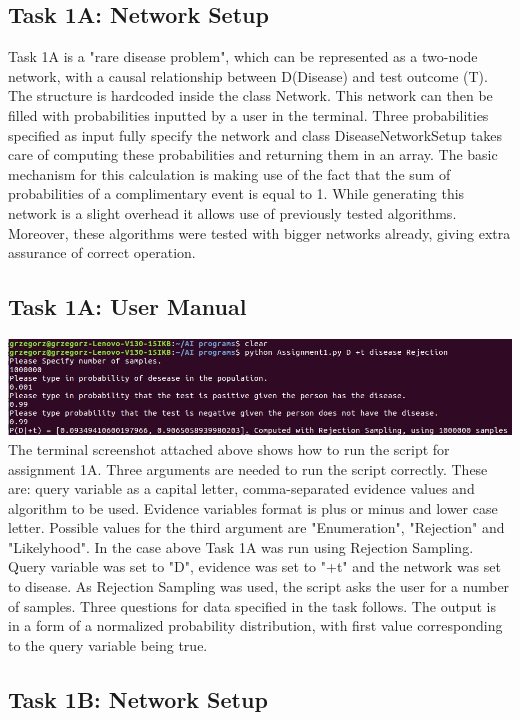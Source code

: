 \documentclass[10pt]{article}
\begin{document}
\subsection{Task 1A: Network Setup}
Task 1A is a "rare disease problem", which can be represented as a two-node network, with a causal relationship between D(Disease) and test outcome (T). The structure is hardcoded inside the class Network. This network can then be filled with probabilities inputted by a user in the terminal. Three probabilities specified as input fully specify the network and class DiseaseNetworkSetup takes care of computing these probabilities and returning them in an array. The basic mechanism for this calculation is making use of the fact that the sum of probabilities of a complimentary event is equal to 1. While generating this network is a slight overhead it allows use of previously tested algorithms. Moreover, these algorithms were tested with bigger networks already, giving extra assurance of correct operation.

\subsection{Task 1A: User Manual}
\includegraphics[width=\textwidth]{UserManual1.jpg}
The terminal screenshot attached above shows how to run the script for assignment 1A. Three arguments are needed to run the script correctly. These are: query variable as a capital letter, comma-separated evidence values and algorithm to be used. Evidence variables format is plus or minus and lower case letter. Possible values for the third argument are "Enumeration", "Rejection" and "Likelyhood". In the case above Task 1A was run using Rejection Sampling. Query variable was set to "D", evidence was set to "+t" and the network was set to disease. As Rejection Sampling was used, the script asks the user for a number of samples. Three questions for data specified in the task follows. The output is in a form of a normalized probability distribution, with first value corresponding to the query variable being true. 

\subsection{Task 1B: Network Setup}
\end{document}
